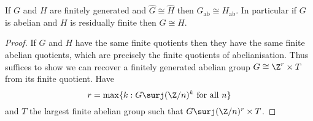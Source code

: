 \documentclass[a4paper]{article}
\begin{document}
\begin{proposition}
  If \(G\) and \(H\) are finitely generated and \(\hat G \cong \hat H\) then \(G_{\mathrm{ab}} \cong H_{\mathrm{ab}}\). In particular if \(G\) is abelian and \(H\) is residually finite then \(G \cong H\).
\end{proposition}

\begin{proof}
  If \(G\) and \(H\) have the same finite quotients then they have the same finite abelian quotients, which are precisely the finite quotients of abelianisation. Thus suffices to show we can recover a finitely generated abelian group \(G \cong \Z^r \times T\) from its finite quotient. Have
  \[
    r = \max\{k: G \surj (\Z/n)^k \text{ for all } n\}
  \]
  and \(T\) the largest finite abelian group such that \(G \surj (\Z/n)^r \times T\).
\end{proof}
\end{document}
